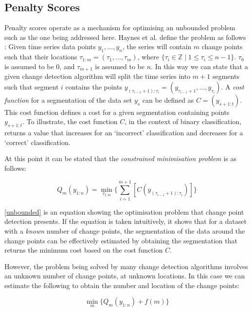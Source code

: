 \documentclass{uvamscse}	%
\begin{document}
\subsection{Penalty Scores}

Penalty scores operate as a mechanism for optimising an unbounded problem such as the one being addressed here. Haynes et al. define the problem as follows \cite{Haynes2014}: Given time series data points $y_1,\ldots,y_n$, the series will contain $m$ change points such that their locations $\tau_{1:m} = (\tau_1,\ldots,\tau_m)$, where $\{\tau_i \in \mathbb{Z} \mid 1 \leqslant \tau_i \leqslant n-1\}$. $\tau_0$ is assumed to be 0, and $\tau_{m+1}$ is assumed to be $n$. In this way we can state that a given change detection algorithm will split the time series into $m + 1$ segments such that segment $i$ contains the points $y_{(\tau_{i-1}+1):\tau_i} = (y_{\tau_{i-1} + 1},\dots,y_{\tau_i})$. A \emph{cost function} for a segmentation of the data set $y_s$ can be defined as $C = (y_{s+1:t})$. This cost function defines a cost for a given segmentation containing points $y_{s+1:t}$. To illustrate, the cost function $C$, in the context of binary classification, returns a value that increases for an `incorrect' classification and decreases for a `correct' classification.

At this point it can be stated that the \emph{constrained minimisation problem} is as follows:

\begin{equation}
\label{unbounded}
    Q_m(y_{1:n}) = \min_{\tau_{1:m}} \Bigg\{ \sum^{m+1}_{i=1}[C(y_{(\tau_{i - 1} + 1):\tau_i})] \Bigg\}
\end{equation}

\autoref{unbounded} is an equation showing the optimisation problem that change point detection presents. If the equation is taken intuitively, it shows that for a dataset with a \emph{known} number of change points, the segmentation of the data around the change points can be effectively estimated by obtaining the segmentation that returns the minimum cost based on the cost function $C$.

However, the problem being solved by many change detection algorithms involves an unknown number of change points, at unknown locations. In this case we can estimate the following to obtain the number and location of the change points:

\begin{equation}
\label{eqn:penalty}
    \min_{m} \big\{ Q_m(y_{1:n}) + f(m) \big\}
\end{equation}
\end{document}
